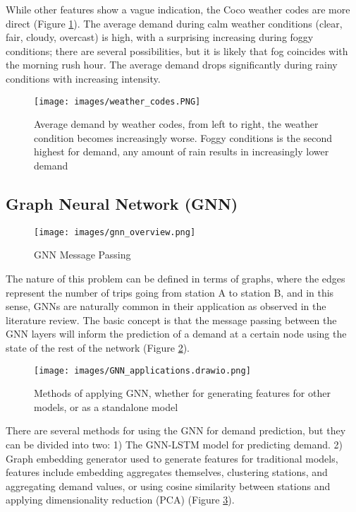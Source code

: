\documentclass{article}
\begin{document}
While other features show a vague indication, the Coco weather codes are more direct (Figure \ref{fig:weather_codes}). The average demand during calm weather conditions (clear, fair, cloudy, overcast) is high, with a surprising increasing during foggy conditions; there are several possibilities, but it is likely that fog coincides with the morning rush hour. The average demand drops significantly during rainy conditions with increasing intensity.

\begin{figure}
\texttt{[image: images/weather\_codes.PNG]}
\caption{Average demand by weather codes, from left to right, the weather condition becomes increasingly worse. Foggy conditions is the second highest for demand, any amount of rain results in increasingly lower demand}
\label{fig:weather_codes}
\end{figure}

\subsection{Graph Neural Network (GNN)}

\begin{figure}
\texttt{[image: images/gnn\_overview.png]}
\caption{GNN Message Passing\cite{kramer2022}}
\label{fig:gnn_messaging}
\end{figure}

The nature of this problem can be defined in terms of graphs, where the edges represent the number of trips going from station A to station B, and in this sense, GNNs are naturally common in their application as observed in the literature review. The basic concept is that the message passing between the GNN layers will inform the prediction of a demand at a certain node using the state of the rest of the network (Figure \ref{fig:gnn_messaging}).


\begin{figure}
\centering
\texttt{[image: images/GNN\_applications.drawio.png]}
\caption{Methods of applying GNN, whether for generating features for other models, or as a standalone model}
\label{fig:gnn_method}
\end{figure}


There are several methods for using the GNN for demand prediction, but they can be divided into two: 1) The GNN-LSTM model for predicting demand. 2) Graph embedding generator used to generate features for traditional models, features include embedding aggregates themselves, clustering stations, and aggregating demand values, or using cosine similarity between stations and applying dimensionality reduction (PCA) (Figure \ref{fig:gnn_method}).
\end{document}
